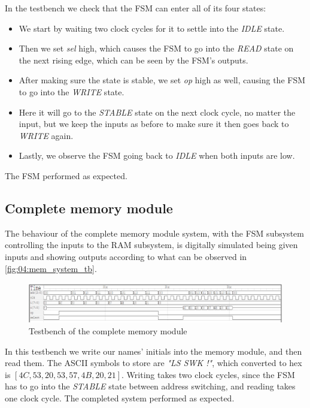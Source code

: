 In the testbench we check that the FSM can enter all of its four states: 

\begin{itemize}
    \item We start by waiting two clock cycles for it to settle into the \textit{IDLE} state. 
    \item Then we set \textit{sel} high, which causes the FSM to go into the \textit{READ} state on the next rising edge, which can be seen by the FSM's outputs. 
    \item After making sure the state is stable, we set \textit{op} high as well, causing the FSM to go into the \textit{WRITE} state. 
    \item Here it will go to the \textit{STABLE} state on the next clock cycle, no matter the input, but we keep the inputs as before to make sure it then goes back to \textit{WRITE} again. 
    \item Lastly, we observe the FSM going back to \textit{IDLE} when both inputs are low.
\end{itemize}
The FSM performed as expected.

\subsection{Complete memory module} \label{sec:04:results:complete_memory_module}
The behaviour of the complete memory module system, with the FSM subsystem controlling the inputs to the RAM subsystem, is digitally simulated being given inputs and showing outputs according to what can be observed in \autoref{fig:04:mem_system_tb}.
\begin{figure}[H]
    \centering
    \includegraphics[width=0.9\linewidth]{LaTeX_2/Figures/mem_system_tb.png}
    \caption{Testbench of the complete memory module}
    \label{fig:04:mem_system_tb}
\end{figure}
In this testbench we write our names' initials into the memory module, and then read them. The ASCII symbols to store are \textit{"LS SWK !"}, which converted to hex is $[4C, 53, 20, 53, 57, 4B, 20, 21]$. Writing takes two clock cycles, since the FSM has to go into the \textit{STABLE} state between address switching, and reading takes one clock cycle. The completed system performed as expected.